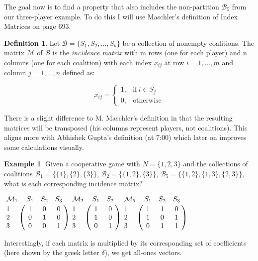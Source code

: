 \documentclass[10pt,a4paper,titlepage]{article}
\theoremstyle{plain}
\theoremstyle{definition}
\newtheorem{definition}[thm]{Definition} %
\newtheorem{example}[thm]{Example} %
\begin{document}
The goal now is to find a property that also includes the non-partition $\mathcal{B}_5$ from our three-player example. To do this I will use Maschler's\cite{maschler} definition of Index Matrices on page 693.

\begin{definition}
    Let $\mathcal{B} = \{S_1, S_2, ..., S_k\}$ be a collection of nonempty coalitions. The matrix $\mathcal{M}$ of $\mathcal{B}$ is the \textit{incidence matrix} with m rows (one for each player) and n columns (one for each coalition) with each index $x_{ij}$ at row $i = {1, ..., m}$ and column $j = {1, ..., n}$ defined as:

    \begin{equation*}
        x_{ij} =
        \begin{cases}
            1, & \text{if}\ i \in S_j\\
            0, & \text{otherwise}
        \end{cases}
    \end{equation*}
\end{definition}

There is a slight difference to M. Maschler's\cite{maschler} definition in that the resulting matrices will be transposed (his columns represent players, not coalitions). This aligns more with Abhishek Gupta's\cite{youtube} definition (at 7:00) which later on improves some calculations visually.

\begin{example}\label{ex:indexmatrix}
    Given a cooperative game with $N = \{1, 2, 3\}$ and the collections of coalitions $\mathcal{B}_1 = \{\{1\}, \{2\}, \{3\}\}$, $\mathcal{B}_2 = \{\{1, 2\}, \{3\}\}$, $\mathcal{B}_5 = \{\{1, 2\}, \{1, 3\}, \{2, 3\}\}$, what is each corresponding incidence matrix?\vspace{8pt}

    $
    \bordermatrix{
    \mathcal{M}_1 & S_1 & S_2 & S_3 \cr
    1 & 1 & 0 & 0 \cr
    2 & 0 & 1 & 0 \cr
    3 & 0 & 0 & 1 \cr
    }
    $\hspace{35pt}$
    \bordermatrix{
    \mathcal{M}_2 & S_1 & S_2\cr
    1 & 1 & 0 \cr
    2 & 1 & 0 \cr
    3 & 0 & 1 \cr
    }
    $\hspace{35pt}$
    \bordermatrix{
    \mathcal{M}_5 & S_1 & S_2 & S_3 \cr
    1 & 1 & 1 & 0 \cr
    2 & 1 & 0 & 1 \cr
    3 & 0 & 1 & 1 \cr
    }
    $\vspace{8pt}
\end{example}

Interestingly, if each matrix is multiplied by its corresponding set of coefficients (here shown by the greek letter $\delta$), we get all-ones vectors.
\end{document}
